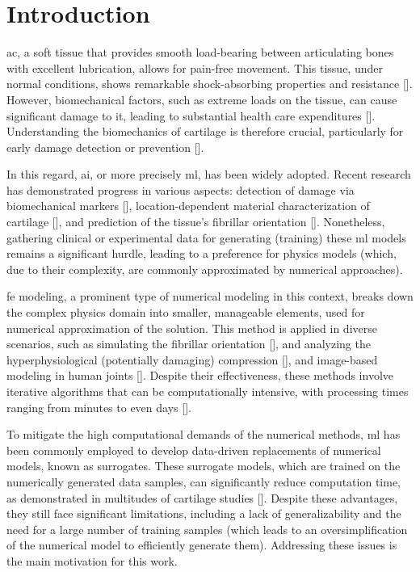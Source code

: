 \documentclass[12pt,a4paper]{report}
\begin{document}
\listoftables{}
\newpage

\acresetall
\chapter{Introduction}

\Ac{ac}, a soft tissue that provides smooth load-bearing between articulating bones with excellent lubrication, allows for pain-free movement. This tissue, under normal conditions, shows remarkable shock-absorbing properties and resistance [\cite{lu2008}]. However, biomechanical factors, such as extreme loads on the tissue, can cause significant damage to it, leading to substantial health care expenditures [\cite{salmon2016}]. Understanding the biomechanics of cartilage is therefore crucial, particularly for early damage detection or prevention [\cite{moreno2019}].

In this regard, \ac{ai}, or more precisely \ac{ml}, has been widely adopted. Recent research has demonstrated progress in various aspects: detection of damage via biomechanical markers [\cite{alunnicardinali2023}], location-dependent material characterization of cartilage [\cite{niasar2023}], and prediction of the tissue's fibrillar orientation [\cite{mirmojarabian2023}]. Nonetheless, gathering clinical or experimental data for generating (training) these \ac{ml} models remains a significant hurdle, leading to a preference for physics models (which, due to their complexity, are commonly approximated by numerical approaches).

\Ac{fe} modeling, a prominent type of numerical modeling in this context, breaks down the complex physics domain into smaller, manageable elements, used for numerical approximation of the solution. This method is applied in diverse scenarios, such as simulating the fibrillar orientation [\cite{sajjadinia2021b}], and analyzing the hyperphysiological (potentially damaging) compression [\cite{occhetta2019}], and image-based modeling in human joints [\cite{thienkarochanakul2020}]. Despite their effectiveness, these methods involve iterative algorithms that can be computationally intensive, with processing times ranging from minutes to even days [\cite{donahue2002,kazemi2011,naghibi2016,wang2018b,lorza2021}].

To mitigate the high computational demands of the numerical methods, \ac{ml} has been commonly employed to develop data-driven replacements of numerical models, known as surrogates. These surrogate models, which are trained on the numerically generated data samples, can significantly reduce computation time, as demonstrated in multitudes of cartilage studies [\cite{paiva2012,arbabi2016a,arbabi2016b,egli2021}]. Despite these advantages, they still face significant limitations, including a lack of generalizability and the need for a large number of training samples (which leads to an oversimplification of the numerical model to efficiently generate them). Addressing these issues is the main motivation for this work.
\end{document}
